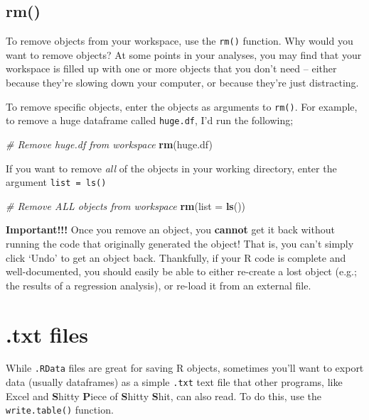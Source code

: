 \documentclass[]{book}
\newenvironment{Shaded}{\begin{snugshade}}{\end{snugshade}}
\newcommand{\KeywordTok}[1]{\textcolor[rgb]{0.13,0.29,0.53}{\textbf{{#1}}}}
\newcommand{\DataTypeTok}[1]{\textcolor[rgb]{0.13,0.29,0.53}{{#1}}}
\newcommand{\CommentTok}[1]{\textcolor[rgb]{0.56,0.35,0.01}{\textit{{#1}}}}
\newcommand{\NormalTok}[1]{{#1}}
\theoremstyle{definition}
\theoremstyle{definition}
\theoremstyle{remark}
\begin{document}
\subsection{rm()}\label{rm}

To remove objects from your workspace, use the \texttt{rm()} function.
Why would you want to remove objects? At some points in your analyses,
you may find that your workspace is filled up with one or more objects
that you don't need -- either because they're slowing down your
computer, or because they're just distracting.

To remove specific objects, enter the objects as arguments to
\texttt{rm()}. For example, to remove a huge dataframe called
\texttt{huge.df}, I'd run the following;

\begin{Shaded}
\begin{Highlighting}[]
\CommentTok{# Remove huge.df from workspace}
\KeywordTok{rm}\NormalTok{(huge.df)}
\end{Highlighting}
\end{Shaded}

If you want to remove \emph{all} of the objects in your working
directory, enter the argument \texttt{list\ =\ ls()}

\begin{Shaded}
\begin{Highlighting}[]
\CommentTok{# Remove ALL objects from workspace}
\KeywordTok{rm}\NormalTok{(}\DataTypeTok{list =} \KeywordTok{ls}\NormalTok{())}
\end{Highlighting}
\end{Shaded}

\textbf{Important!!!} Once you remove an object, you \textbf{cannot} get
it back without running the code that originally generated the object!
That is, you can't simply click `Undo' to get an object back.
Thankfully, if your R code is complete and well-documented, you should
easily be able to either re-create a lost object (e.g.; the results of a
regression analysis), or re-load it from an external file.

\section{.txt files}\label{txt-files}

While \texttt{.RData} files are great for saving R objects, sometimes
you'll want to export data (usually dataframes) as a simple
\texttt{.txt} text file that other programs, like Excel and
\textbf{S}hitty \textbf{P}iece of \textbf{S}hitty \textbf{S}hit, can
also read. To do this, use the \texttt{write.table()} function.
\end{document}
